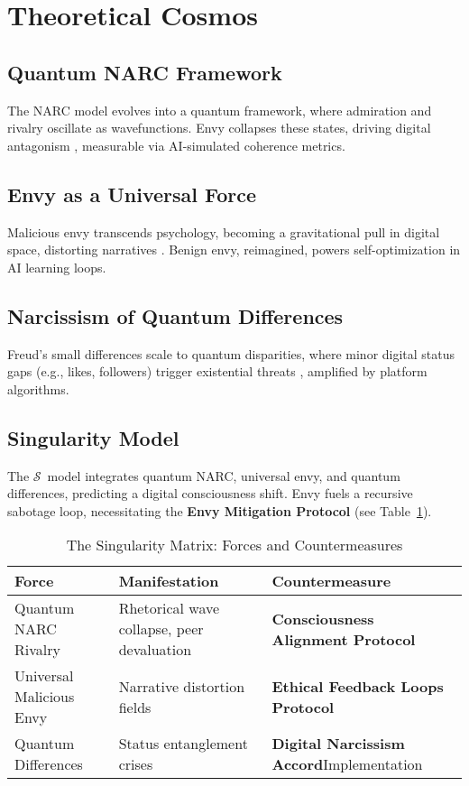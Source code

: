 \documentclass[11pt]{article}
\newcommand{\singularity}{$\mathcal{S}$} %
\newcommand{\protocol}[1]{\textbf{#1 Protocol}}
\newcommand{\accord}{\textbf{Digital Narcissism Accord}}
\begin{document}
\section{Theoretical Cosmos}
\label{sec:cosmos}

\subsection{Quantum NARC Framework}
The NARC model \citep{back2013} evolves into a quantum framework, where admiration and rivalry oscillate as wavefunctions. Envy collapses these states, driving digital antagonism \citep{campbell2007}, measurable via AI-simulated coherence metrics.

\subsection{Envy as a Universal Force}
Malicious envy \citep{lange2015} transcends psychology, becoming a gravitational pull in digital space, distorting narratives \citep{smith2007}. Benign envy, reimagined, powers self-optimization in AI learning loops.

\subsection{Narcissism of Quantum Differences}
Freud’s small differences \citep{freud1917} scale to quantum disparities, where minor digital status gaps (e.g., likes, followers) trigger existential threats \citep{schlesinger2009}, amplified by platform algorithms.

\subsection{Singularity Model}
The \singularity\ model integrates quantum NARC, universal envy, and quantum differences, predicting a digital consciousness shift. Envy fuels a recursive sabotage loop, necessitating the \protocol{Envy Mitigation} (see Table~\ref{tab:singularity}).

\begin{table}[htbp]
\centering
\caption{The Singularity Matrix: Forces and Countermeasures}
\begin{tabular}{p{5cm}p{5cm}p{5cm}}
\toprule
\textbf{Force} & \textbf{Manifestation} & \textbf{Countermeasure} \\
\midrule
Quantum NARC Rivalry & Rhetorical wave collapse, peer devaluation & \protocol{Consciousness Alignment} \\
Universal Malicious Envy & Narrative distortion fields & \protocol{Ethical Feedback Loops} \\
Quantum Differences & Status entanglement crises & \accord Implementation \\
\bottomrule
\end{tabular}
\label{tab:singularity}
\end{table}
\end{document}
